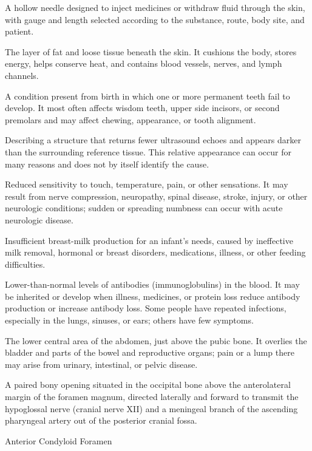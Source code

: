  A hollow needle designed to inject medicines or withdraw fluid through the skin, with gauge and length selected according to the substance, route, body site, and patient.

 The layer of fat and loose tissue beneath the skin. It cushions the body, stores energy, helps conserve heat, and contains blood vessels, nerves, and lymph channels.

 A condition present from birth in which one or more permanent teeth fail to develop. It most often affects wisdom teeth, upper side incisors, or second premolars and may affect chewing, appearance, or tooth alignment.

 Describing a structure that returns fewer ultrasound echoes and appears darker than the surrounding reference tissue. This relative appearance can occur for many reasons and does not by itself identify the cause.

 Reduced sensitivity to touch, temperature, pain, or other sensations. It may result from nerve compression,
neuropathy, spinal disease, stroke, injury, or other neurologic conditions; sudden or spreading
numbness can occur with acute neurologic disease.

 Insufficient breast-milk production for an infant’s needs, caused by ineffective milk removal, hormonal or breast disorders, medications, illness, or other feeding difficulties.

 Lower-than-normal levels of antibodies (immunoglobulins) in the blood. It may be inherited or develop when illness, medicines, or protein loss reduce antibody production or increase antibody loss. Some people have repeated infections, especially in the lungs, sinuses, or ears; others have few symptoms.

 The lower central area of the abdomen, just above the pubic bone. It overlies the bladder and parts of the bowel and reproductive organs; pain or a lump there may arise from urinary, intestinal, or pelvic disease.

 A paired bony opening situated in the occipital bone above the anterolateral margin of the foramen magnum, directed laterally and forward to transmit the hypoglossal nerve (cranial nerve XII) and a meningeal branch of the ascending pharyngeal artery out of the posterior cranial fossa.

\synonyms
Anterior Condyloid Foramen

